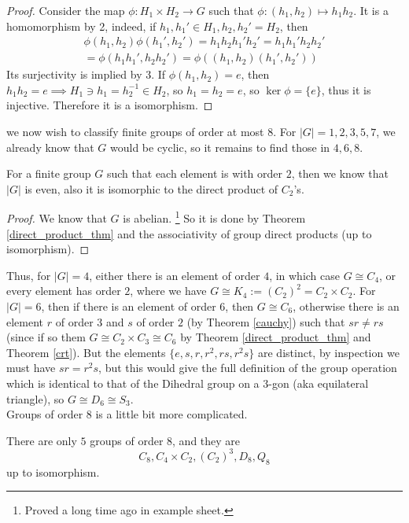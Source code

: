 \begin{proof}
    Consider the map $\phi:H_1\times H_2\to G$ such that $\phi:(h_1,h_2)\mapsto h_1h_2$.
    It is a homomorphism by 2, indeed, if $h_1,h_1'\in H_1, h_2,h_2'=H_2$, then
    \begin{align*}
        \phi(h_1,h_2)\phi(h_1',h_2')=h_1h_2h_1'h_2'=h_1h_1'h_2h_2'\\
        =\phi(h_1h_1',h_2h_2')=\phi((h_1,h_2)(h_1',h_2'))
    \end{align*}
    Its surjectivity is implied by 3.
    If $\phi(h_1,h_2)=e$, then $h_1h_2=e\implies H_1\ni h_1=h_2^{-1}\in H_2$, so $h_1=h_2=e$, so $\ker\phi=\{e\}$, thus it is injective.
    Therefore it is a isomorphism.
\end{proof}
we now wish to classify finite groups of order at most $8$.
For $|G|=1,2,3,5,7$, we already know that $G$ would be cyclic, so it remains to find those in $4,6,8$.
\begin{theorem}
    For a finite group $G$ such that each element is with order $2$, then we know that $|G|$ is even, also it is isomorphic to the direct product of $C_2$'s.
\end{theorem}
\begin{proof}
    We know that $G$ is abelian.
    \footnote{Proved a long time ago in example sheet.}
    So it is done by Theorem \ref{direct_product_thm} and the associativity of group direct products (up to isomorphism).
\end{proof}
Thus, for $|G|=4$, either there is an element of order $4$, in which case $G\cong C_4$, or every element has order $2$, where we have $G\cong K_4:=(C_2)^2=C_2\times C_2$.
For $|G|=6$, then if there is an element of order $6$, then $G\cong C_6$, otherwise there is an element $r$ of order $3$ and $s$ of order $2$ (by Theorem \ref{cauchy}) such that $sr\neq rs$ (since if so them $G\cong C_2\times C_3\cong C_6$ by Theorem \ref{direct_product_thm} and Theorem \ref{crt}).
But the elements $\{e,s,r,r^2,rs,r^2s\}$ are distinct, by inspection we must have $sr=r^2s$, but this would give the full definition of the group operation which is identical to that of the Dihedral group on a $3$-gon (aka equilateral triangle), so $G\cong D_6\cong S_3$.\\
Groups of order $8$ is a little bit more complicated.
\begin{claim}
    There are only $5$ groups of order $8$, and they are
    $$C_8,C_4\times C_2,(C_2)^3,D_8,Q_8$$
    up to isomorphism.
\end{claim}
